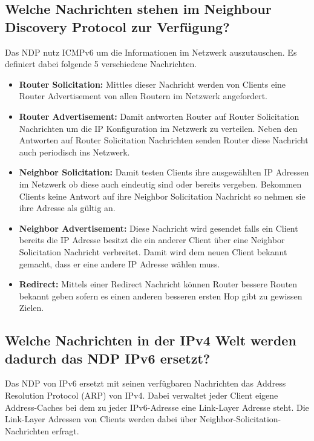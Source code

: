 \documentclass[a4paper,12pt]{article} %
\begin{document}
\subsection{Welche Nachrichten stehen im Neighbour Discovery Protocol zur Verfügung?}
Das NDP nutz ICMPv6 um die Informationen im Netzwerk auszutauschen. Es definiert dabei folgende 5 verschiedene Nachrichten.
\begin{itemize}
\item \textbf{Router Solicitation:} Mittles dieser Nachricht werden von Clients eine Router Advertisement von allen Routern im Netzwerk angefordert.
\item \textbf{Router Advertisement:} Damit antworten Router auf Router Solicitation Nachrichten um die IP Konfiguration im Netzwerk zu verteilen. Neben den Antworten auf Router Solicitation Nachrichten senden Router diese Nachricht auch periodisch ins Netzwerk.
\item \textbf{Neighbor Solicitation:} Damit testen Clients ihre ausgewählten IP Adressen im Netzwerk ob diese auch eindeutig sind oder bereits vergeben. Bekommen Clients keine Antwort auf ihre Neighbor Solicitation Nachricht so nehmen sie ihre Adresse als gültig an.
\item \textbf{Neighbor Advertisement:} Diese Nachricht wird gesendet falls ein Client bereits die IP Adresse besitzt die ein anderer Client über eine Neighbor Solicitation Nachricht verbreitet. Damit wird dem neuen Client bekannt gemacht, dass er eine andere IP Adresse wählen muss.
\item \textbf{Redirect:} Mittels einer Redirect Nachricht können Router bessere Routen bekannt geben sofern es einen anderen besseren ersten Hop gibt zu gewissen Zielen.
\end{itemize}

\subsection{Welche Nachrichten in der IPv4 Welt werden dadurch das NDP IPv6 ersetzt?}
Das NDP von IPv6 ersetzt mit seinen verfügbaren Nachrichten das Address Resolution Protocol (ARP) von IPv4. Dabei verwaltet jeder Client eigene Address-Caches bei dem zu jeder IPv6-Adresse eine Link-Layer Adresse steht. Die Link-Layer Adressen von Clients werden dabei über Neighbor-Solicitation-Nachrichten erfragt.
\end{document}
